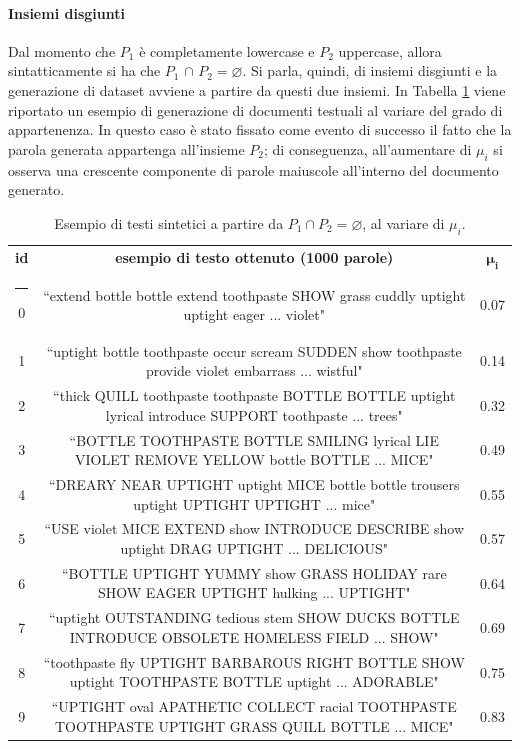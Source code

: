 \documentclass[12pt]{report}
\makeatletter
\theoremstyle{definition}
\newcommand{\thickhline}{%
    \noalign {\ifnum 0=`}\fi \hrule height 1pt
    \futurelet \reserved@a \@xhline
}
\let\emptyset\varnothing
\makeatother
\begin{document}
\paragraph{Insiemi disgiunti}
Dal momento che $P_1$ è completamente lowercase e $P_2$ uppercase, allora sintatticamente si ha che $P_1$ $\cap$ $P_2 = \emptyset$. Si parla, quindi, di insiemi disgiunti e la generazione di dataset avviene a partire da questi due insiemi. In Tabella \ref{generationexample} viene riportato un esempio di generazione di documenti testuali al variare del grado di appartenenza. In questo caso è stato fissato come evento di successo il fatto che la parola generata appartenga all'insieme $P_2$; di conseguenza, all'aumentare di $\mu_i$ si osserva una crescente componente di parole maiuscole all'interno del documento generato.
\begin{table}[!h]
\centering
\begin{adjustbox}{max width=\textwidth}
 \begin{tabular}{|c|c|c|} 
 \hline
\textbf{id} & \textbf{esempio di testo ottenuto (1000 parole)} & $\bm{\mu_i}$  
\\ [0.5ex] 
 \thickhline
0 & ``extend bottle bottle extend toothpaste SHOW grass cuddly uptight uptight eager ... violet" & 0.07 \\ 
1 & ``uptight bottle toothpaste occur scream SUDDEN show toothpaste provide violet embarrass ... wistful" & 0.14 \\
2 & ``thick QUILL toothpaste toothpaste BOTTLE BOTTLE uptight lyrical introduce SUPPORT toothpaste ... trees" & 0.32 \\
3 & ``BOTTLE TOOTHPASTE BOTTLE SMILING lyrical LIE VIOLET REMOVE YELLOW bottle BOTTLE ... MICE" & 0.49 \\
4 & ``DREARY NEAR UPTIGHT uptight MICE bottle bottle trousers uptight UPTIGHT UPTIGHT ... mice" & 0.55\\
5 & ``USE violet MICE EXTEND show INTRODUCE DESCRIBE show uptight DRAG UPTIGHT ... DELICIOUS" & 0.57\\
6 & ``BOTTLE UPTIGHT YUMMY show GRASS HOLIDAY rare SHOW EAGER UPTIGHT hulking ... UPTIGHT" & 0.64\\
7 & ``uptight OUTSTANDING tedious stem SHOW DUCKS BOTTLE INTRODUCE OBSOLETE HOMELESS FIELD ... SHOW" & 0.69 \\
8 & ``toothpaste fly UPTIGHT BARBAROUS RIGHT BOTTLE SHOW uptight TOOTHPASTE BOTTLE uptight ... ADORABLE" & 0.75\\
9 & ``UPTIGHT oval APATHETIC COLLECT racial TOOTHPASTE TOOTHPASTE UPTIGHT GRASS QUILL BOTTLE ... MICE" & 0.83\\
 \hline
\end{tabular}
\end{adjustbox}
\caption{Esempio di testi sintetici a partire da $P_1 \cap P_2 = \emptyset$, al variare di $\mu_i$.}
\label{generationexample}
\end{table}
\end{document}
